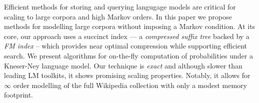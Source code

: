 Efficient methods for storing and querying langugage models are critical for scaling to large corpora and high Markov orders.
In this paper we propose methods for modelling large corpora without
imposing a Markov condition.
At its core, our approach uses a succinct index --- a \emph{compressed suffix tree} backed by a \emph{FM index} -- which provides near optimal compression while supporting efficient search.
We present algorithms for on-the-fly computation of probabilities under a
Kneser-Ney language model.
Our technique is \emph{exact} and although slower than leading LM
toolkits, it shows promising scaling properties.
Notably, it allows for $\infty$ order modelling of the full Wikipedia collection
with only a modest memory footprint. 

%
%
%
%

